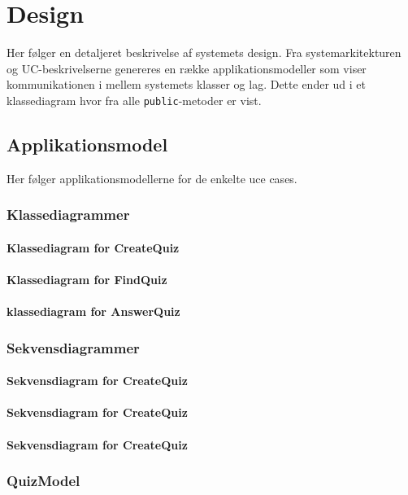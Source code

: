 \chapter{Design}
Her følger en detaljeret beskrivelse af systemets design. Fra systemarkitekturen og UC-beskrivelserne genereres en række applikationsmodeller som viser kommunikationen i mellem systemets klasser og lag. Dette ender ud i et klassediagram hvor fra alle \verb+public+-metoder er vist.

\section{Applikationsmodel}
Her følger applikationsmodellerne for de enkelte uce cases.

\subsection{Klassediagrammer}

\subsubsection{Klassediagram for CreateQuiz}


\subsubsection{Klassediagram for FindQuiz}



\subsubsection{klassediagram for AnswerQuiz}


\subsection{Sekvensdiagrammer}

\subsubsection{Sekvensdiagram for CreateQuiz}


\subsubsection{Sekvensdiagram for CreateQuiz}


\subsubsection{Sekvensdiagram for CreateQuiz}


\subsection{QuizModel}

